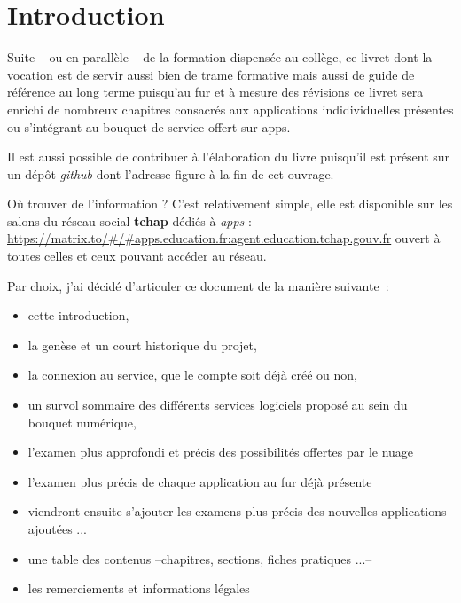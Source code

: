 \chapter{Introduction}

Suite -- ou en parallèle -- de la formation dispensée au collège, ce livret dont la vocation est de servir aussi bien de trame formative mais aussi de guide de référence au long terme puisqu'au fur et à mesure des révisions ce livret sera enrichi de nombreux chapitres consacrés aux applications indidividuelles présentes ou s'intégrant au bouquet de service offert sur apps.

Il est aussi possible de contribuer à l'élaboration du livre puisqu'il est présent sur un dépôt \emph{github} dont l'adresse figure à la fin de cet ouvrage. 

Où trouver de l'information ? C'est relativement simple, elle est disponible sur les salons du réseau social \textbf{tchap} dédiés à \emph{apps} : \url{https://matrix.to/#/#apps.education.fr:agent.education.tchap.gouv.fr} ouvert à toutes celles et ceux pouvant accéder au réseau.

Par choix, j'ai décidé d'articuler ce document de la manière suivante~:
\begin{itemize}
	\item cette introduction,
	\item la genèse et un court historique du projet,
	\item la connexion au service, que le compte soit déjà créé ou non,
	\item un survol sommaire des différents services logiciels proposé au sein du bouquet numérique,
	\item l'examen plus approfondi et précis des possibilités offertes par le nuage
	\item l'examen plus précis de chaque application au fur déjà présente
	\item viendront ensuite s'ajouter les examens plus précis des nouvelles applications ajoutées ...
	\item une table des contenus --chapitres, sections, fiches pratiques ...-- 
	\item les remerciements et informations légales
\end{itemize}

